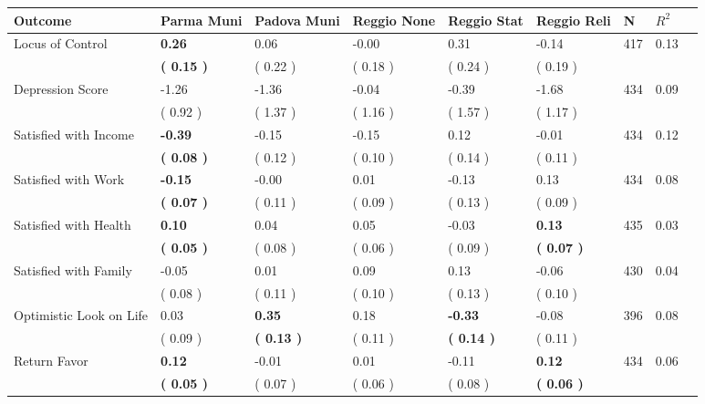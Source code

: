 \begin{tabular}{L{6.2cm} C{1.8cm} C{1.8cm} C{1.8cm} C{1.8cm} C{1.8cm} C{1.8cm} C{0.3cm} C{0.3cm}}
\toprule
 \textbf{Outcome} & \textbf{Parma Muni} & \textbf{Padova Muni} & \textbf{Reggio None} & \textbf{Reggio Stat} & \textbf{Reggio Reli} & \textbf{N} & \textbf{$ R^2$} \\
\midrule
Locus of Control & \textbf{     0.26} &      0.06 &     -0.00 &      0.31 &     -0.14  & 417 &       0.13 \\ 
 & \textbf{(     0.15 )} & (     0.22 ) & (     0.18 ) & (     0.24 ) & (     0.19 )  & \\
Depression Score &     -1.26 &     -1.36 &     -0.04 &     -0.39 &     -1.68  & 434 &       0.09 \\ 
 & (     0.92 ) & (     1.37 ) & (     1.16 ) & (     1.57 ) & (     1.17 )  & \\
Satisfied with Income & \textbf{    -0.39} &     -0.15 &     -0.15 &      0.12 &     -0.01  & 434 &       0.12 \\ 
 & \textbf{(     0.08 )} & (     0.12 ) & (     0.10 ) & (     0.14 ) & (     0.11 )  & \\
Satisfied with Work & \textbf{    -0.15} &     -0.00 &      0.01 &     -0.13 &      0.13  & 434 &       0.08 \\ 
 & \textbf{(     0.07 )} & (     0.11 ) & (     0.09 ) & (     0.13 ) & (     0.09 )  & \\
Satisfied with Health & \textbf{     0.10} &      0.04 &      0.05 &     -0.03 & \textbf{     0.13}  & 435 &       0.03 \\ 
 & \textbf{(     0.05 )} & (     0.08 ) & (     0.06 ) & (     0.09 ) & \textbf{(     0.07 )}  & \\
Satisfied with Family &     -0.05 &      0.01 &      0.09 &      0.13 &     -0.06  & 430 &       0.04 \\ 
 & (     0.08 ) & (     0.11 ) & (     0.10 ) & (     0.13 ) & (     0.10 )  & \\
Optimistic Look on Life &      0.03 & \textbf{     0.35} &      0.18 & \textbf{    -0.33} &     -0.08  & 396 &       0.08 \\ 
 & (     0.09 ) & \textbf{(     0.13 )} & (     0.11 ) & \textbf{(     0.14 )} & (     0.11 )  & \\
Return Favor & \textbf{     0.12} &     -0.01 &      0.01 &     -0.11 & \textbf{     0.12}  & 434 &       0.06 \\ 
 & \textbf{(     0.05 )} & (     0.07 ) & (     0.06 ) & (     0.08 ) & \textbf{(     0.06 )}  & \\

\end{tabular}
